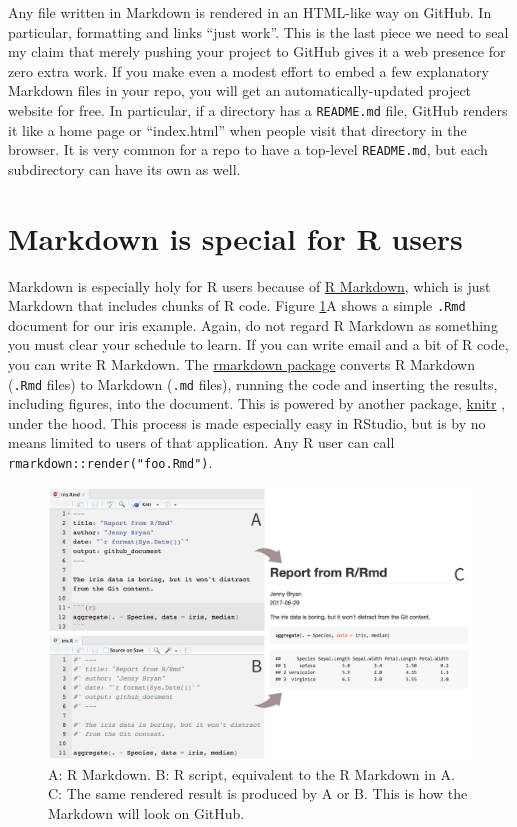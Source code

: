\documentclass[12pt]{article}
\begin{document}
Any file written in Markdown is rendered in an HTML-like way on GitHub.
In particular, formatting and links ``just work''. This is the last
piece we need to seal my claim that merely pushing your project to
GitHub gives it a web presence for zero extra work. If you make even a
modest effort to embed a few explanatory Markdown files in your repo,
you will get an automatically-updated project website for free. In
particular, if a directory has a \texttt{README.md} file, GitHub renders
it like a home page or ``index.html'' when people visit that directory
in the browser. It is very common for a repo to have a top-level
\texttt{README.md}, but each subdirectory can have its own as well.

\section{Markdown is special for R
users}\label{markdown-is-special-for-r-users}

Markdown is especially holy for R users because of
\href{http://rmarkdown.rstudio.com}{R Markdown}, which is just Markdown
that includes chunks of R code. Figure \ref{fig:report-from-r-or-rmd}A
shows a simple \texttt{.Rmd} document for our iris example. Again, do
not regard R Markdown as something you must clear your schedule to
learn. If you can write email and a bit of R code, you can write R
Markdown. The
\href{https://CRAN.R-project.org/package=rmarkdown}{rmarkdown package}
\citep{rmd-pkg} converts R Markdown (\texttt{.Rmd} files) to Markdown
(\texttt{.md} files), running the code and inserting the results,
including figures, into the document. This is powered by another
package, \href{https://CRAN.R-project.org/package=knitr}{knitr}
\citep{knitr-pkg, knitr-book}, under the hood. This process is made
especially easy in RStudio, but is by no means limited to users of that
application. Any R user can call \texttt{rmarkdown::render("foo.Rmd")}.

\begin{figure}
\includegraphics[width=1\linewidth]{report-from-r-or-rmd} \caption{\label{fig:report-from-r-or-rmd}A: R Markdown. B: R script, equivalent to the R Markdown in A. C: The same rendered result is produced by A or B. This is how the Markdown will look on GitHub.}\label{fig:report-from-r-or-rmd}
\end{figure}
\end{document}
